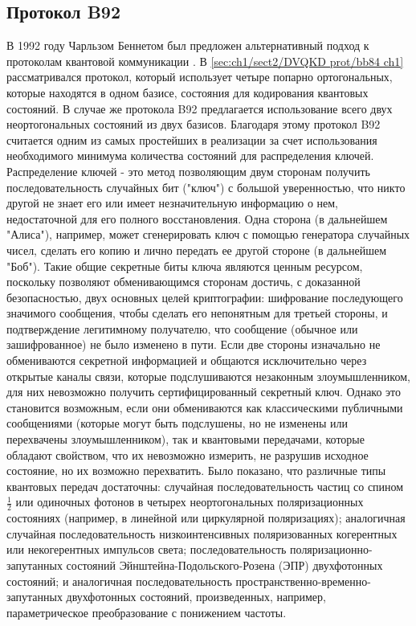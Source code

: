 \subsection{Протокол B92}\label{sec:ch1/sect2/DVQKD prot/b92 ch1}
В 1992 году Чарльзом Беннетом был предложен альтернативный подход к протоколам квантовой коммуникации \cite{bennett1992}. В \ref{sec:ch1/sect2/DVQKD prot/bb84 ch1} рассматривался протокол, который использует четыре попарно ортогональных, которые находятся в одном базисе, состояния  для кодирования квантовых состояний. В случае же протокола B92 предлагается использование всего двух неортогональных состояний из двух базисов. Благодаря этому протокол B92 считается одним из самых простейших в реализации за счет использования необходимого  минимума количества состояний для распределения ключей.
\newline Распределение ключей - это метод позволяющим двум сторонам получить последовательность случайных бит ("ключ") с большой уверенностью, что никто другой не знает его или имеет незначительную информацию о нем, недостаточной для его полного восстановления. Одна сторона (в дальнейшем "Алиса"), например, может сгенерировать ключ с помощью генератора случайных чисел, сделать его копию и лично передать ее другой стороне (в дальнейшем "Боб"). Такие общие секретные биты ключа являются ценным ресурсом, поскольку позволяют обменивающимся сторонам достичь, с доказанной безопасностью, двух основных целей криптографии: шифрование последующего значимого сообщения, чтобы сделать его непонятным для третьей стороны, и подтверждение легитимному получателю, что сообщение (обычное или зашифрованное) не было изменено в пути.
\newline Если две стороны изначально не обмениваются секретной информацией и общаются исключительно через открытые каналы связи, которые подслушиваются незаконным злоумышленником, для них невозможно получить сертифицированный секретный ключ. Однако это становится возможным, если они обмениваются как классическими публичными сообщениями (которые могут быть подслушены, но не изменены или перехвачены злоумышленником), так и квантовыми передачами, которые обладают свойством, что их невозможно измерить, не разрушив исходное состояние, но их возможно перехватить. Было показано, что различные типы квантовых передач достаточны: случайная последовательность частиц со спином $\frac{1}{2}$ или одиночных фотонов в четырех неортогональных поляризационных состояниях (например, в линейной или циркулярной поляризациях); аналогичная случайная последовательность низкоинтенсивных поляризованных когерентных или некогерентных импульсов света; последовательность поляризационно-запутанных состояний Эйнштейна-Подольского-Розена (ЭПР) двухфотонных состояний; и аналогичная последовательность пространственно-временно-запутанных двухфотонных состояний, произведенных, например, параметрическое преобразование с понижением частоты. 
